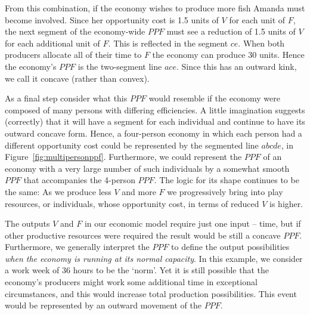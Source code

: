 From this combination, if the economy wishes to produce more fish Amanda
must become involved. Since her opportunity cost is 1.5 units of $V$ for
each unit of $F$, the next segment of the economy-wide $PPF$ must see a
reduction of 1.5 units of $V$ for each additional unit of $F$. This is
reflected in the segment $ce$. When both producers allocate all of their
time to $F$ the economy can produce 30 units. Hence the economy's $PPF$ is
the two-segment line $ace$. Since this has an outward kink, we call it
concave (rather than convex).

\newhtmlpage

As a final step consider what this $PPF$ would resemble if the economy were
composed of many persons with differing efficiencies. A
little imagination suggests (correctly) that it will have a segment for each
individual and continue to have its outward concave form. Hence, a
four-person economy in which each person had a different opportunity cost
could be represented by the segmented line $abcde$, in Figure~\ref{fig:multipersonppf}.
Furthermore, we could represent the $PPF$ of an
economy with a very large number of such individuals by a somewhat smooth $%
PPF$ that accompanies the 4-person $PPF$. The logic for its shape continues
to be the same: As we produce less $V$ and more $F$ we progressively bring
into play resources, or individuals, whose opportunity cost, in terms of
reduced $V$ is higher.



The outputs $V$ and $F$ in our economic model require just one input --
time, but if other productive resources were required the result would be
still a concave $PPF$. Furthermore, we generally interpret the $PPF$ to
define the output possibilities \textit{when the economy is running at its
normal capacity}. In this example, we consider a work week of 36 hours to be
the `norm'. Yet it is still possible that the economy's producers might work
some additional time in exceptional circumstances, and this would increase
total production possibilities. This event would be represented by an
outward movement of the $PPF$.
